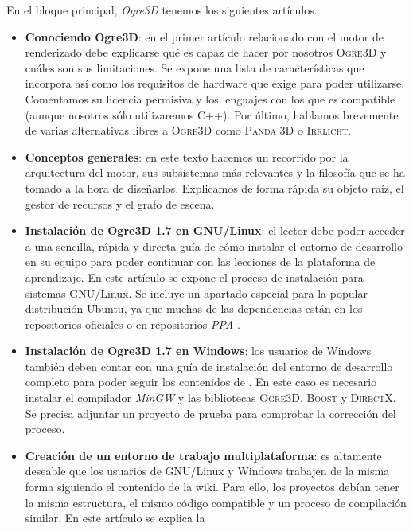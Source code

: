 En el bloque principal, \textit{Ogre3D} tenemos los siguientes artículos.

\begin{itemize}
    \itemsep0em
    \item \textbf{Conociendo Ogre3D}: en el primer artículo relacionado
    con el motor de renderizado debe explicarse qué es capaz de hacer
    por nosotros \textsc{Ogre3D} y cuáles son sus limitaciones. Se expone
    una lista de características que incorpora así como los requisitos
    de hardware que exige para poder utilizarse. Comentamos su licencia
    permisiva y los lenguajes con los que es compatible (aunque nosotros
    sólo utilizaremos C++). Por último, hablamos brevemente de varias alternativas
    libres a \textsc{Ogre3D} como \textsc{Panda 3D} o \textsc{Irrlicht}.
    \item \textbf{Conceptos generales}: en este texto hacemos un recorrido
    por la arquitectura del motor, sus subsistemas más relevantes y la filosofía
    que se ha tomado a la hora de diseñarlos. Explicamos de forma rápida
    su objeto raíz, el gestor de recursos y el grafo de escena.
    \item \textbf{Instalación de Ogre3D 1.7 en GNU/Linux}: el lector
    debe poder acceder a una sencilla, rápida y directa guía de cómo instalar
    el entorno de desarrollo en su equipo para poder continuar con las lecciones
    de la plataforma de aprendizaje. En este artículo se expone el proceso
    de instalación para sistemas GNU/Linux. Se incluye un apartado
    especial para la popular distribución Ubuntu, ya que muchas de las dependencias
    están en los repositorios oficiales o en repositorios \textit{PPA}
    \cite{website:ppa}.
    \item \textbf{Instalación de Ogre3D 1.7 en Windows}: los usuarios de
    Windows también deben contar con una guía de instalación del entorno
    de desarrollo completo para poder seguir los contenidos de \wiki. En este
    caso es necesario instalar el compilador \textit{MinGW} y las bibliotecas
    \textsc{Ogre3D}, \textsc{Boost} y \textsc{DirectX}. Se precisa adjuntar un proyecto
    de prueba para comprobar la corrección del proceso.
    \item \textbf{Creación de un entorno de trabajo multiplataforma}: es
    altamente deseable que los usuarios de GNU/Linux y Windows trabajen
    de la misma forma siguiendo el contenido de la wiki. Para ello, los proyectos
    debían tener la misma estructura, el mismo código compatible y 
    un proceso de compilación similar. En este artículo se explica la

\end{itemize}
